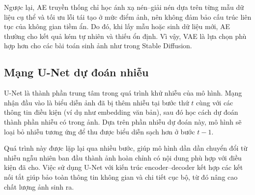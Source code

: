 \documentclass[../main.tex]{subfiles}
\begin{document}
Ngược lại, AE truyền thống chỉ học ánh xạ nén–giải nén dựa trên từng mẫu dữ liệu cụ thể và tối ưu lỗi tái tạo ở mức điểm ảnh, nên không đảm bảo cấu trúc liên tục của không gian tiềm ẩn. Do đó, khi lấy mẫu hoặc sinh dữ liệu mới, AE thường cho kết quả kém tự nhiên và thiếu ổn định. Vì vậy, VAE là lựa chọn phù hợp hơn cho các bài toán sinh ảnh như trong Stable Diffusion.

\subsection{Mạng U-Net dự đoán nhiễu}
U-Net là thành phần trung tâm trong quá trình khử nhiễu của mô hình. Mạng nhận đầu vào là biểu diễn ảnh đã bị thêm nhiễu tại bước thứ $t$ cùng với các thông tin điều kiện (ví dụ như embedding văn bản), sau đó học cách dự đoán thành phần nhiễu có trong ảnh. Dựa trên phần nhiễu dự đoán này, mô hình sẽ loại bỏ nhiễu tương ứng để thu được biểu diễn sạch hơn ở bước $t-1$.

Quá trình này được lặp lại qua nhiều bước, giúp mô hình dần dần chuyển đổi từ nhiễu ngẫu nhiên ban đầu thành ảnh hoàn chỉnh có nội dung phù hợp với điều kiện đã cho. Việc sử dụng U-Net với kiến trúc encoder--decoder kết hợp các kết nối tắt giúp bảo toàn thông tin không gian và chi tiết cục bộ, từ đó nâng cao chất lượng ảnh sinh ra.
\end{document}
